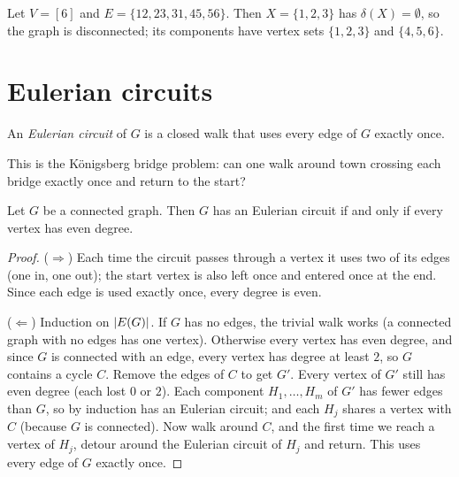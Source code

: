 \begin{example}
Let $V = [6]$ and $E = \{12, 23, 31, 45, 56\}$. Then $X = \{1,2,3\}$ has $\delta(X) = \emptyset$,
so the graph is disconnected; its components have vertex sets $\{1,2,3\}$ and $\{4,5,6\}$.
\end{example}

\begin{center}
\end{center}

\section{Eulerian circuits}

\begin{definition}
An \emph{Eulerian circuit} of $G$ is a closed walk that uses every edge of $G$ exactly once.
\end{definition}

This is the K\"onigsberg bridge problem: can one walk around town crossing each bridge exactly
once and return to the start?

\begin{theorem}[Euler]
Let $G$ be a connected graph. Then $G$ has an Eulerian circuit if and only if every vertex has
even degree.
\end{theorem}
\begin{proof}
($\Rightarrow$) Each time the circuit passes through a vertex it uses two of its edges (one in,
one out); the start vertex is also left once and entered once at the end. Since each edge is used
exactly once, every degree is even.

($\Leftarrow$) Induction on $\left\lvert E(G) \right\rvert$. If $G$ has no edges, the trivial walk works (a connected
graph with no edges has one vertex). Otherwise every vertex has even degree, and since $G$ is
connected with an edge, every vertex has degree at least $2$, so $G$ contains a cycle $C$.
Remove the edges of $C$ to get $G'$. Every vertex of $G'$ still has even degree (each lost $0$ or
$2$). Each component $H_1,\dots,H_m$ of $G'$ has fewer edges than $G$, so by induction has an
Eulerian circuit; and each $H_j$ shares a vertex with $C$ (because $G$ is connected). Now walk
around $C$, and the first time we reach a vertex of $H_j$, detour around the Eulerian circuit of
$H_j$ and return. This uses every edge of $G$ exactly once.
\end{proof}

